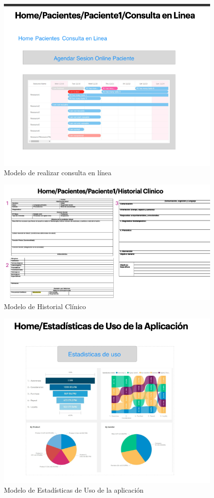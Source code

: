\documentclass[12pt]{article}
\begin{document}
\begin{figure}[ht]
\centering
\includegraphics[scale=0.4]{imag/P10.png}
\caption{ Modelo de realizar consulta en línea}
\label{6}
\end{figure}
\FloatBarrier



\begin{figure}[ht]
\centering
\includegraphics[scale=0.36]{imag/P11.png}
\caption{Modelo de Historial Clínico }
\label{6}
\end{figure}
\FloatBarrier


\begin{figure}[ht]
\centering
\includegraphics[scale=0.36]{imag/P12.png}
\caption{Modelo de Estadísticas de Uso de la aplicación }
\label{6}
\end{figure}
\FloatBarrier
\end{document}
